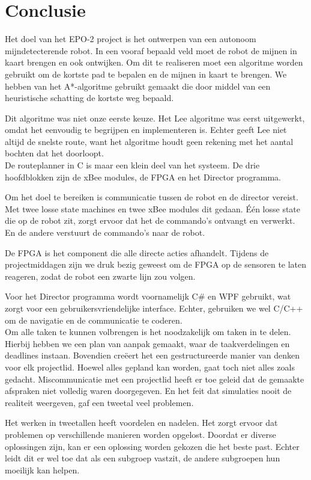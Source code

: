 \documentclass{report}
\begin{document}
\chapter{Conclusie}
\label{ch:conclusie}

Het doel van het EPO-2 project is het ontwerpen van een autonoom mijndetecterende robot. In een vooraf bepaald veld moet de robot de mijnen in kaart brengen en ook ontwijken. 
Om dit te realiseren moet een algoritme worden gebruikt om de kortste pad te bepalen en de mijnen in kaart te brengen. We hebben van het A*-algoritme gebruikt gemaakt die door middel van een heuristische schatting de kortste weg bepaald. 

Dit algoritme was niet onze eerste keuze. Het Lee algoritme was eerst uitgewerkt, omdat het eenvoudig te begrijpen en implementeren is. Echter geeft Lee niet altijd de snelste route, want het algoritme houdt geen rekening met het aantal bochten dat het doorloopt.\\

De routeplanner in C is maar een klein deel van het systeem. De drie hoofdblokken zijn de xBee modules, de FPGA en het Director programma. 

Om het doel te bereiken is communicatie tussen de robot en de director vereist. Met twee losse state machines en twee xBee modules dit gedaan. \'E\'en losse state die op de robot zit, zorgt ervoor dat het de commando's ontvangt en verwerkt. En de andere verstuurt de commando's naar de robot.

De FPGA is het component die alle directe acties afhandelt. Tijdens de projectmiddagen zijn we druk bezig geweest om de FPGA op de sensoren te laten reageren, zodat de robot een zwarte lijn zou volgen. 

Voor het Director programma wordt voornamelijk C\# en WPF gebruikt, wat zorgt voor een gebruikersvriendelijke interface. Echter, gebruiken we wel C/C++ om de navigatie en de communicatie te coderen.\\

Om alle taken te kunnen volbrengen is het noodzakelijk om taken in te delen. Hierbij hebben we een plan van aanpak gemaakt, waar de taakverdelingen en deadlines instaan. Bovendien cre\"eert het een gestructureerde manier van denken voor elk projectlid.
Hoewel alles gepland kan worden, gaat toch niet alles zoals gedacht. Miscommunicatie met een projectlid heeft er toe geleid dat de gemaakte afspraken niet volledig waren doorgegeven. En het feit dat simulaties nooit de realiteit weergeven, gaf een tweetal veel problemen.

Het werken in tweetallen heeft voordelen en nadelen. Het zorgt ervoor dat problemen op verschillende manieren worden opgelost. Doordat er diverse oplossingen zijn, kan er een oplossing worden gekozen die het beste past. Echter leidt dit er wel toe dat als een subgroep vastzit, de andere subgroepen hun moeilijk kan helpen.  
\end{document}
